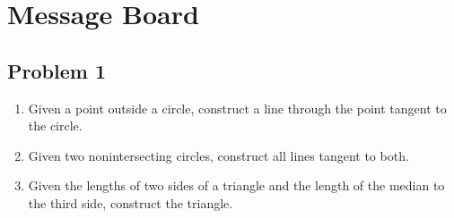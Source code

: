 \section{Message Board}

\subsection{Problem 1}
\begin{enumerate}
    \item Given a point outside a circle, construct a line through the point tangent to the circle.


    \item Given two nonintersecting circles, construct all lines tangent to both.
    
    
    \item Given the lengths of two sides of a triangle and the length of the median to the third side, construct the triangle.
    
\end{enumerate}

